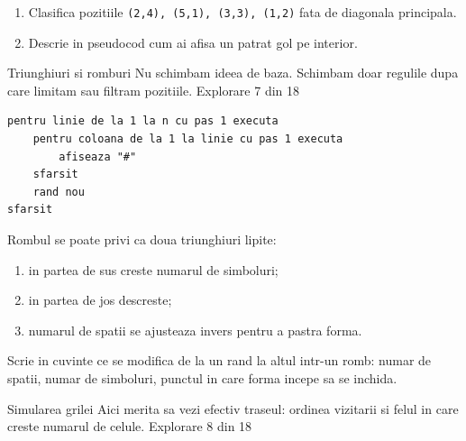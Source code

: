 \begin{guidebox}
\begin{enumerate}
\item Clasifica pozitiile \texttt{(2,4), (5,1), (3,3), (1,2)} fata de diagonala principala.
\item Descrie in pseudocod cum ai afisa un patrat gol pe interior.
\end{enumerate}
\end{guidebox}

\clearpage

\PageHeader
  {Triunghiuri si romburi}
  {Nu schimbam ideea de baza. Schimbam doar regulile dupa care limitam sau filtram pozitiile.}
  {Explorare 7 din 18}

\begin{examplebox}
\begin{lstlisting}[style=codequest]
pentru linie de la 1 la n cu pas 1 executa
    pentru coloana de la 1 la linie cu pas 1 executa
        afiseaza "#"
    sfarsit
    rand nou
sfarsit
\end{lstlisting}
\end{examplebox}

\begin{missionbox}
Rombul se poate privi ca doua triunghiuri lipite:
\begin{enumerate}
\item in partea de sus creste numarul de simboluri;
\item in partea de jos descreste;
\item numarul de spatii se ajusteaza invers pentru a pastra forma.
\end{enumerate}
\end{missionbox}

\begin{semibox}[Aplicam]
Scrie in cuvinte ce se modifica de la un rand la altul intr-un romb: numar de spatii, numar de simboluri, punctul in care forma incepe sa se inchida.
\end{semibox}

\clearpage

\PageHeader
  {Simularea grilei}
  {Aici merita sa vezi efectiv traseul: ordinea vizitarii si felul in care creste numarul de celule.}
  {Explorare 8 din 18}


